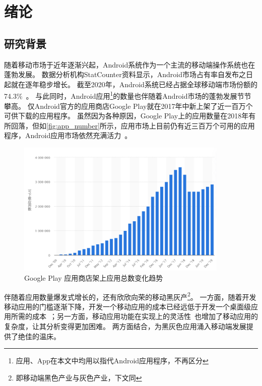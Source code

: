 \chapter {绪论}
\label{chp:intro}

\section{研究背景}

随着移动市场于近年逐渐兴起，Android系统作为一个主流的移动端操作系统也在蓬勃发展。
数据分析机构StatCounter资料显示，Android市场占有率自发布之日起就在逐年稳步增长。
截至2020年，Android系统已经占据全球移动端市场份额的74.3\%~\cite{MobileOSMktShare}。
与此同时，Android应用\footnote{应用、App在本文中均用以指代Android应用程序，不再区分}的数量也伴随着Android市场的蓬勃发展节节攀高。
仅Android官方的应用商店Google Play就在2017年中新上架了近一百万个可供下载的应用程序。
虽然因为各种原因，Google Play上的应用数量在2018年有所回落，但如\autoref{fig:app_number}所示，应用市场上目前仍有近三百万个可用的应用程序，Android应用市场依然充满活力~\cite{StatistaAppNumber}。

\begin{figure}[htbp]
	\centering
	\includegraphics[width=0.9\textwidth]{./Figures/edwin-intro-app-number.png}
	\caption{Google Play 应用商店架上应用总数变化趋势}
	\label{fig:app_number}
\end{figure}

伴随着应用数量爆发式增长的，还有欣欣向荣的移动黑灰产\footnote{即移动端黑色产业与灰色产业，下文同}。
一方面，随着开发移动应用的门槛逐渐下降，开发一个移动应用的成本已经远低于开发一个桌面级应用所需的成本~\cite{wasserman2010software}；另一方面，移动应用功能在实现上的灵活性~\cite{storydroid}也增加了移动应用的复杂度，让其分析变得更加困难。
两方面结合，为黑灰色应用涌入移动端发展提供了绝佳的温床。

